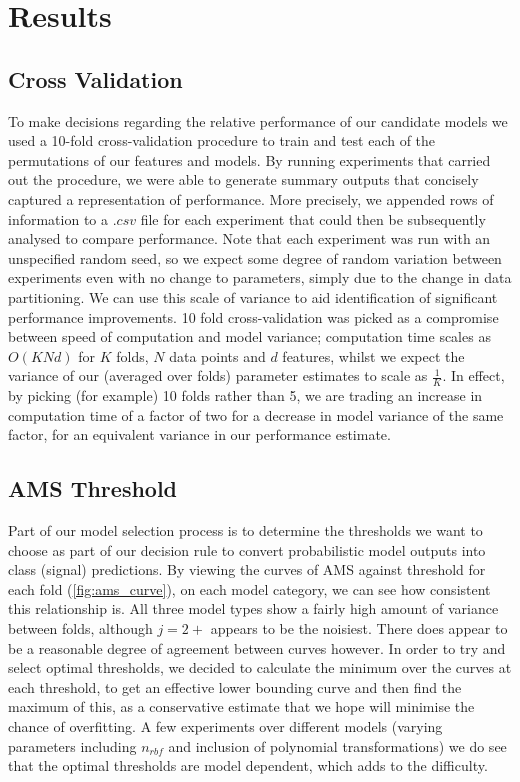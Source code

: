 \section{Results}
\label{results}

\subsection{Cross Validation}
To make decisions regarding the relative performance of our candidate models we used a 10-fold cross-validation procedure to train and test each of the permutations of our features and models. By running experiments that carried out the procedure, we were able to generate summary outputs that concisely captured a representation of performance. More precisely, we appended rows of information to a $.csv$ file for each experiment that could then be subsequently analysed to compare performance. Note that each experiment was run with an unspecified random seed, so we expect some degree of random variation between experiments even with no change to parameters, simply due to the change in data partitioning. We can use this scale of variance to aid identification of significant performance improvements. 10 fold cross-validation was picked as a compromise between speed of computation and model variance; computation time scales as $O(KNd)$ for $K$ folds, $N$ data points and $d$ features, whilst we expect the variance of our (averaged over folds) parameter estimates to scale as $\frac{1}{K}$. In effect, by picking (for example) 10 folds rather than 5, we are trading an increase in computation time of a factor of two for a decrease in model variance of the same factor, for an equivalent variance in our performance estimate.

\subsection{AMS Threshold}
Part of our model selection process is to determine the thresholds we want to choose as part of our decision rule to convert probabilistic model outputs into class (signal) predictions. By viewing the curves of AMS against threshold for each fold (\ref{fig:ams_curve}), on each model category, we can see how consistent this relationship is. All three model types show a fairly high amount of variance between folds, although $j=2+$ appears to be the noisiest. There does appear to be a reasonable degree of agreement between curves however. In order to try and select optimal thresholds, we decided to calculate the minimum over the curves at each threshold, to get an effective lower bounding curve and then find the maximum of this, as a conservative estimate that we hope will minimise the chance of overfitting. 
A few experiments over different models (varying parameters including $n_{rbf}$ and inclusion of polynomial transformations) we do see that the optimal thresholds are model dependent, which adds to the difficulty. 

